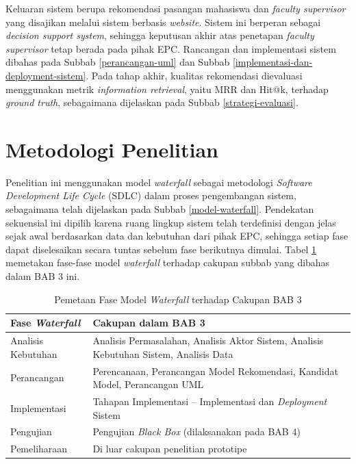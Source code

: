 Keluaran sistem berupa rekomendasi pasangan mahasiswa dan \textit{faculty supervisor} yang disajikan melalui sistem berbasis \textit{website}. Sistem ini berperan sebagai \textit{decision support system}, sehingga keputusan akhir atas penetapan \textit{faculty supervisor} tetap berada pada pihak EPC. Rancangan dan implementasi sistem dibahas pada Subbab \ref{perancangan-uml} dan Subbab \ref{implementasi-dan-deployment-sistem}. Pada tahap akhir, kualitas rekomendasi dievaluasi menggunakan metrik \textit{information retrieval}, yaitu MRR dan Hit@k, terhadap \textit{ground truth}, sebagaimana dijelaskan pada Subbab \ref{strategi-evaluasi}.

\section{Metodologi Penelitian}\label{metodologi-penelitian}

Penelitian ini menggunakan model \textit{waterfall} sebagai metodologi \textit{Software Development Life Cycle} (SDLC) dalam proses pengembangan sistem, sebagaimana telah dijelaskan pada Subbab \ref{model-waterfall}. Pendekatan sekuensial ini dipilih karena ruang lingkup sistem telah terdefinisi dengan jelas sejak awal berdasarkan data dan kebutuhan dari pihak EPC, sehingga setiap fase dapat diselesaikan secara tuntas sebelum fase berikutnya dimulai. Tabel \ref{tab:waterfall-mapping} memetakan fase-fase model \textit{waterfall} terhadap cakupan subbab yang dibahas dalam BAB 3 ini.

\begin{table}[H]
\centering
\caption{Pemetaan Fase Model \textit{Waterfall} terhadap Cakupan BAB 3}
\label{tab:waterfall-mapping}
\begin{tabular}{|p{4cm}|p{9cm}|}
\hline
\textbf{Fase \textit{Waterfall}} & \textbf{Cakupan dalam BAB 3} \\
\hline
Analisis Kebutuhan & Analisis Permasalahan, Analisis Aktor Sistem, Analisis Kebutuhan Sistem, Analisis Data \\
\hline
Perancangan & Perencanaan, Perancangan Model Rekomendasi, Kandidat Model, Perancangan UML \\
\hline
Implementasi & Tahapan Implementasi -- Implementasi dan \textit{Deployment} Sistem \\
\hline
Pengujian & Pengujian \textit{Black Box} (dilaksanakan pada BAB 4) \\
\hline
Pemeliharaan & Di luar cakupan penelitian prototipe \\
\hline
\end{tabular}
\end{table}

